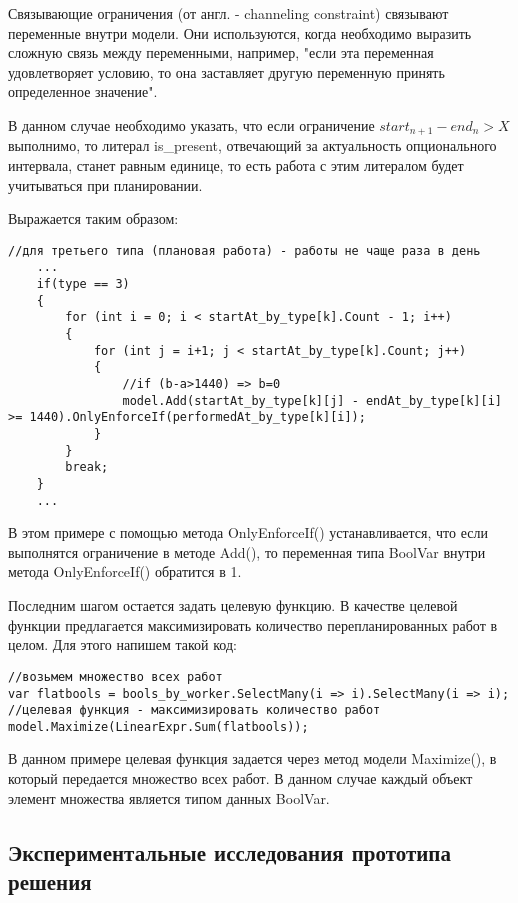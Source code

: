 Связывающие ограничения (от англ. - channeling constraint) связывают переменные внутри модели. Они используются, когда необходимо выразить сложную связь между переменными, например, "если эта переменная удовлетворяет условию, то она заставляет другую переменную принять определенное значение".

В данном случае необходимо указать, что если ограничение $start_{n+1} - end_n > X$ выполнимо, то литерал is\_present, отвечающий за актуальность опционального интервала, станет равным единице, то есть работа с этим литералом будет учитываться при планировании.

Выражается таким образом:

\begin{verbatim}
//для третьего типа (плановая работа) - работы не чаще раза в день
    ...
    if(type == 3)
    {
        for (int i = 0; i < startAt_by_type[k].Count - 1; i++)
        {
            for (int j = i+1; j < startAt_by_type[k].Count; j++)
            {
                //if (b-a>1440) => b=0
                model.Add(startAt_by_type[k][j] - endAt_by_type[k][i] >= 1440).OnlyEnforceIf(performedAt_by_type[k][i]);
            }
        }
        break;
    }
    ...    
\end{verbatim}

В этом примере с помощью метода OnlyEnforceIf() устанавливается, что если выполнятся ограничение в методе Add(), то переменная типа BoolVar внутри метода OnlyEnforceIf() обратится в 1.

Последним шагом остается задать целевую функцию. В качестве целевой функции предлагается максимизировать количество перепланированных работ в целом. Для этого напишем такой код:

\begin{verbatim}
//возьмем множество всех работ
var flatbools = bools_by_worker.SelectMany(i => i).SelectMany(i => i);
//целевая функция - максимизировать количество работ
model.Maximize(LinearExpr.Sum(flatbools));
\end{verbatim}

В данном примере целевая функция задается через метод модели Maximize(), в который передается множество всех работ. В данном случае каждый объект элемент множества является типом данных BoolVar.


\subsection{Экспериментальные исследования прототипа решения}

